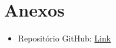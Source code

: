 \section{Anexos}

\begin{itemize}
    \item Repositório GitHub: \href{https://github.com/mattsu014/FisicaHalliday_OndasAntenas}{Link}
\end{itemize}
